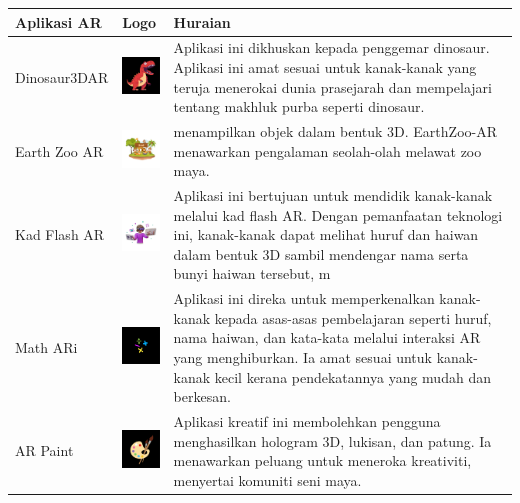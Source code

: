 \begin{tabular}{>{\raggedright}p{3cm}>{\centering}p{2cm}p{8cm}}
\toprule
\textbf{Aplikasi AR} & \textbf{Logo} & \textbf{Huraian} \\
\midrule
Dinosaur3DAR & 
\includegraphics[width=1.5cm]{dino.pdf}& 
Aplikasi ini dikhuskan kepada penggemar dinosaur.  Aplikasi ini amat sesuai untuk kanak-kanak yang teruja menerokai dunia prasejarah dan mempelajari tentang makhluk purba seperti dinosaur.\\

Earth Zoo AR & 
\includegraphics[width=1.5cm]{===200.pdf}& 
 menampilkan objek dalam bentuk 3D. EarthZoo-AR menawarkan pengalaman seolah-olah melawat zoo maya.\\

Kad Flash AR & 
\includegraphics[width=1.5cm]{===300.pdf}& 
Aplikasi ini bertujuan untuk mendidik kanak-kanak melalui kad flash AR. Dengan pemanfaatan teknologi ini, kanak-kanak dapat melihat huruf dan haiwan dalam bentuk 3D sambil mendengar nama serta bunyi haiwan tersebut, m\\

Math ARi & 
\includegraphics[width=1.5cm]{mate.pdf} & 
Aplikasi ini direka untuk memperkenalkan kanak-kanak kepada asas-asas pembelajaran seperti huruf, nama haiwan, dan kata-kata melalui interaksi AR yang menghiburkan. Ia amat sesuai untuk kanak-kanak kecil kerana pendekatannya yang mudah dan berkesan. \\

AR Paint & 
\includegraphics[width=1.5cm]{zooz1.pdf}& 
Aplikasi kreatif ini membolehkan pengguna menghasilkan hologram 3D, lukisan, dan patung. Ia menawarkan peluang untuk meneroka kreativiti, menyertai komuniti seni maya.\\
\bottomrule
\end{tabular}

